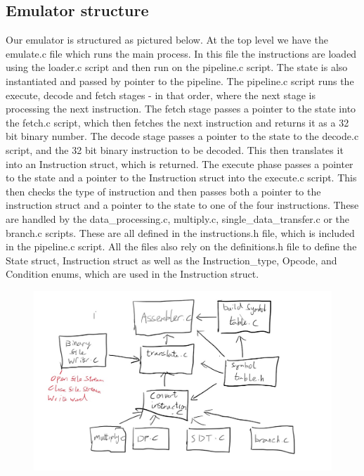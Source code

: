 \documentclass[11pt]{article}
\begin{document}
  \subsection*{Emulator structure}

Our emulator is structured as pictured below. At the top level we have the emulate.c file which runs the main process. In this file the instructions are loaded using the loader.c script and then run on the pipeline.c script. The state is also instantiated and passed by pointer to the pipeline. The pipeline.c script runs the execute, decode and fetch stages - in that order, where the next stage is processing the next instruction. The fetch stage passes a pointer to the state into the fetch.c script, which then fetches the next instruction and returns it as a 32 bit binary number. The decode stage passes a pointer to the state to the decode.c script, and the 32 bit binary instruction to be decoded. This then translates it into an Instruction struct, which is returned. The execute phase passes a pointer to the state and a pointer to the Instruction struct into the execute.c script. This then checks the type of instruction and then passes both a pointer to the instruction struct and a pointer to the state to one of the four instructions. These are handled by the data_processing.c, multiply.c, single_data_transfer.c or the branch.c scripts. These are all defined in the instructions.h file, which is included in the pipeline.c script. All the files also rely on the definitions.h file to define the State struct, Instruction struct as well as the Instruction_type, Opcode, and Condition enums, which are used in the Instruction struct.

 \begin{figure}[h]
 \includegraphics[scale=0.4]{emulate_structure}
 \centering
 \end{figure}

  
\end{document}
